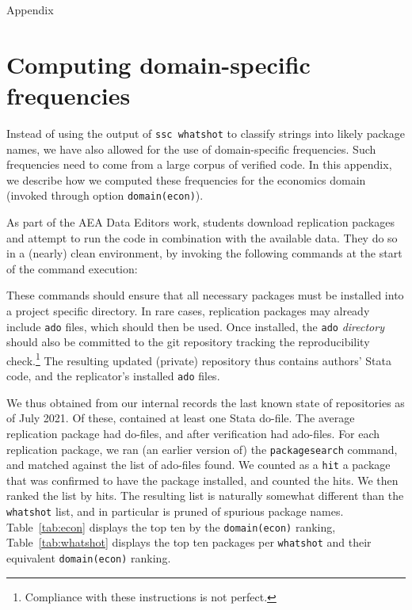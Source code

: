 
\newpage
\begin{center}
	\large Appendix
\end{center}
\setcounter{section}{0}
\renewcommand{\thesection}{Appendix \arabic{section}}   

\section{Computing domain-specific frequencies}


Instead of using the output of \texttt{ssc whatshot} to classify strings into likely package names, we have also allowed for the use of domain-specific frequencies. Such frequencies need to come from a large corpus of verified code. In this appendix, we describe how we computed these frequencies for the economics domain (invoked through option \texttt{domain(econ)}).

As part of the AEA Data Editors work, students download replication packages and attempt to run the code in combination with the available data. They do so in a (nearly) clean environment, by invoking the following commands at the start of the command execution:

\begin{stlog}
\nullskip
\end{stlog}

These commands should ensure that all necessary packages must be installed into a project specific directory. In rare cases, replication packages may already include \texttt{ado} files, which should then be used. Once installed, the \texttt{ado} \textit{directory} should also be committed to the git repository tracking the reproducibility check.\footnote{Compliance with these instructions is not perfect.} The resulting updated (private) repository thus contains authors' Stata code, and the replicator's installed \texttt{ado} files. 

We thus obtained from our internal records the last known state of \anaearep{} repositories as of July 2021. Of these, \anaearepp{} contained at least one Stata do-file. The average replication package had \adocount{} do-files, and after verification had \aadocount{} ado-files. For each replication package, we ran (an earlier version of) the \texttt{packagesearch} command, and matched against the list of ado-files found. We counted as a \texttt{hit} a package that was confirmed to have the package installed, and counted the hits. We then ranked the list by hits. The resulting list is naturally somewhat different than the \texttt{whatshot} list, and in particular is pruned of spurious package names. Table~\ref{tab:econ} displays the top ten by the \texttt{domain(econ)} ranking, Table~\ref{tab:whatshot} displays the top ten packages per \texttt{whatshot} and their equivalent \texttt{domain(econ)} ranking.

